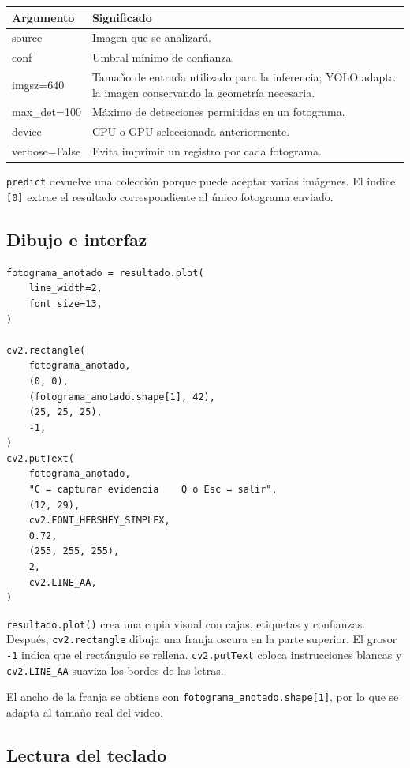 \documentclass[11pt,a4paper]{article}
\begin{document}
\begin{tabularx}{\textwidth}{>{\ttfamily}p{} X}
\toprule
\textrm{\textbf{Argumento}} & \textbf{Significado} \\
\midrule
source & Imagen que se analizará. \\
conf & Umbral mínimo de confianza. \\
imgsz=640 & Tamaño de entrada utilizado para la inferencia; YOLO adapta la
imagen conservando la geometría necesaria. \\
max\_det=100 & Máximo de detecciones permitidas en un fotograma. \\
device & CPU o GPU seleccionada anteriormente. \\
verbose=False & Evita imprimir un registro por cada fotograma. \\
\bottomrule
\end{tabularx}

\texttt{predict} devuelve una colección porque puede aceptar varias imágenes.
El índice \texttt{[0]} extrae el resultado correspondiente al único fotograma
enviado.

\subsection{Dibujo e interfaz}

\begin{lstlisting}
fotograma_anotado = resultado.plot(
    line_width=2,
    font_size=13,
)

cv2.rectangle(
    fotograma_anotado,
    (0, 0),
    (fotograma_anotado.shape[1], 42),
    (25, 25, 25),
    -1,
)
cv2.putText(
    fotograma_anotado,
    "C = capturar evidencia    Q o Esc = salir",
    (12, 29),
    cv2.FONT_HERSHEY_SIMPLEX,
    0.72,
    (255, 255, 255),
    2,
    cv2.LINE_AA,
)
\end{lstlisting}

\texttt{resultado.plot()} crea una copia visual con cajas, etiquetas y
confianzas. Después, \texttt{cv2.rectangle} dibuja una franja oscura en la
parte superior. El grosor \texttt{-1} indica que el rectángulo se rellena.
\texttt{cv2.putText} coloca instrucciones blancas y
\texttt{cv2.LINE\_AA} suaviza los bordes de las letras.

El ancho de la franja se obtiene con
\texttt{fotograma\_anotado.shape[1]}, por lo que se adapta al tamaño real del
video.

\subsection{Lectura del teclado}
\end{document}
